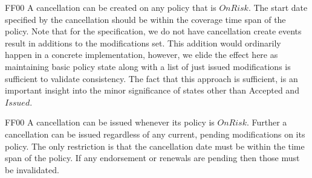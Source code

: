 %
%
%
%
\@pvspace{8.0pt}%
\begin{lcom}{7.5}%
\begin{cpar}{0}{F}{F}{0}{0}{}%
 A cancellation can be created on any policy that is \ensuremath{OnRisk}. The
 start date specified by
 the cancellation should be within the coverage time span of the policy.
 Note that for the specification, we do not have cancellation create events
 result in
 additions to the modifications set. This addition would ordinarily happen in
 a concrete
 implementation, however, we elide the effect here as maintaining basic
 policy state along
 with a list of just issued modifications is sufficient to validate
 consistency. The fact
 that this approach is sufficient, is an important insight into the minor
 significance of
 states other than Accepted and \ensuremath{Issued}.
\end{cpar}%
\end{lcom}%
%
%
%
%
\@xx{}%
%
\@pvspace{8.0pt}%
\begin{lcom}{7.5}%
\begin{cpar}{0}{F}{F}{0}{0}{}%
 A cancellation can be issued whenever its policy is \ensuremath{OnRisk}.
 Further a cancellation can be
 issued regardless of any current, pending modifications on its policy. The
 only
 restriction is that the cancellation date must be within the time span of
 the policy. If
 any endorsement or renewals are pending then those must be invalidated.
\end{cpar}%
\end{lcom}%
